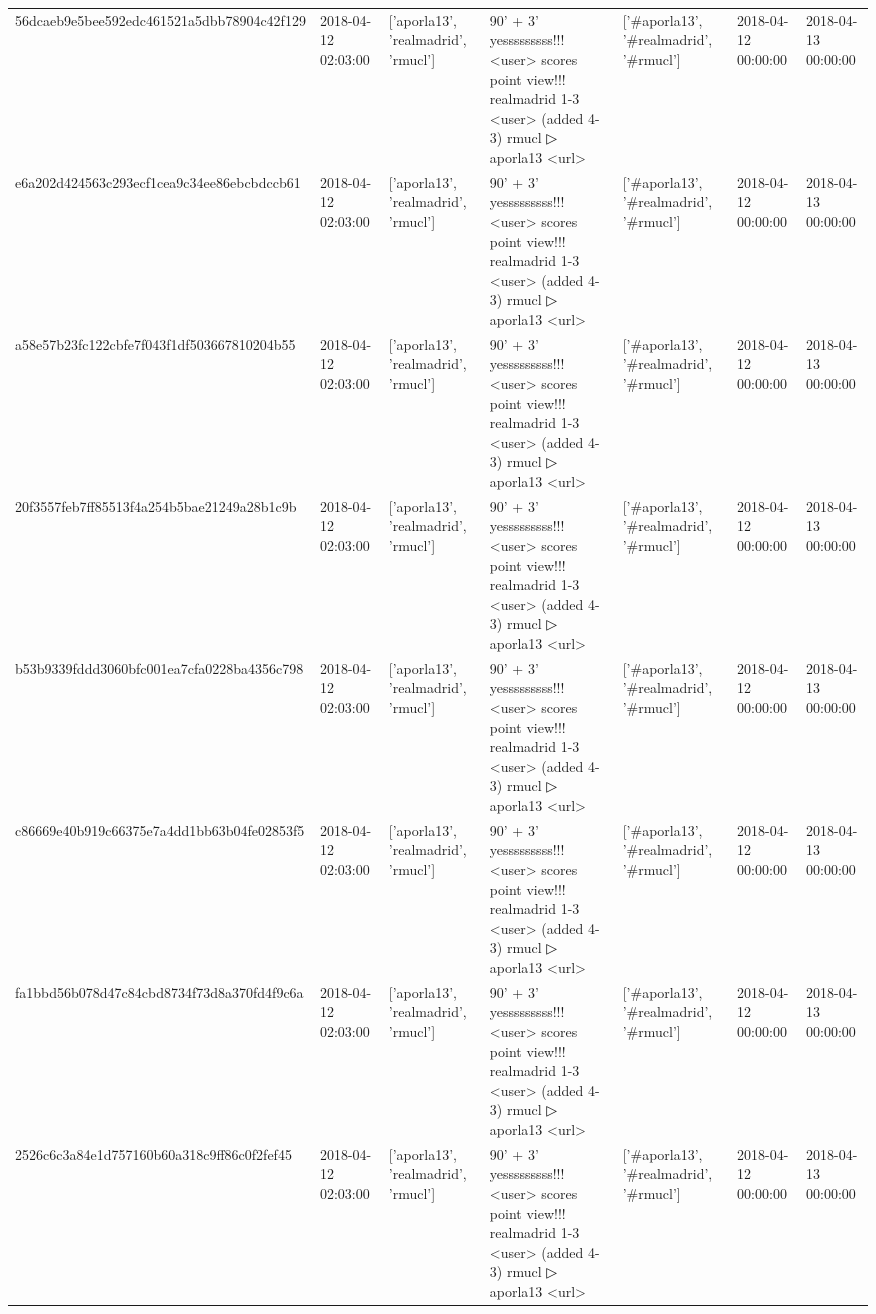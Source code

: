 \begin{tabular}{lllllll}
56dcaeb9e5bee592edc461521a5dbb78904c42f129 & 2018-04-12 02:03:00 & ['aporla13', 'realmadrid', 'rmucl'] & 90' + 3' yesssssssss!!! <user> scores point view!!! realmadrid 1-3 <user> (added 4-3) rmucl ▷ aporla13 <url> & ['#aporla13', '#realmadrid', '#rmucl'] & 2018-04-12 00:00:00 & 2018-04-13 00:00:00 \\
e6a202d424563c293ecf1cea9c34ee86ebcbdccb61 & 2018-04-12 02:03:00 & ['aporla13', 'realmadrid', 'rmucl'] & 90' + 3' yesssssssss!!! <user> scores point view!!! realmadrid 1-3 <user> (added 4-3) rmucl ▷ aporla13 <url> & ['#aporla13', '#realmadrid', '#rmucl'] & 2018-04-12 00:00:00 & 2018-04-13 00:00:00 \\
a58e57b23fc122cbfe7f043f1df503667810204b55 & 2018-04-12 02:03:00 & ['aporla13', 'realmadrid', 'rmucl'] & 90' + 3' yesssssssss!!! <user> scores point view!!! realmadrid 1-3 <user> (added 4-3) rmucl ▷ aporla13 <url> & ['#aporla13', '#realmadrid', '#rmucl'] & 2018-04-12 00:00:00 & 2018-04-13 00:00:00 \\
20f3557feb7ff85513f4a254b5bae21249a28b1c9b & 2018-04-12 02:03:00 & ['aporla13', 'realmadrid', 'rmucl'] & 90' + 3' yesssssssss!!! <user> scores point view!!! realmadrid 1-3 <user> (added 4-3) rmucl ▷ aporla13 <url> & ['#aporla13', '#realmadrid', '#rmucl'] & 2018-04-12 00:00:00 & 2018-04-13 00:00:00 \\
b53b9339fddd3060bfc001ea7cfa0228ba4356c798 & 2018-04-12 02:03:00 & ['aporla13', 'realmadrid', 'rmucl'] & 90' + 3' yesssssssss!!! <user> scores point view!!! realmadrid 1-3 <user> (added 4-3) rmucl ▷ aporla13 <url> & ['#aporla13', '#realmadrid', '#rmucl'] & 2018-04-12 00:00:00 & 2018-04-13 00:00:00 \\
c86669e40b919c66375e7a4dd1bb63b04fe02853f5 & 2018-04-12 02:03:00 & ['aporla13', 'realmadrid', 'rmucl'] & 90' + 3' yesssssssss!!! <user> scores point view!!! realmadrid 1-3 <user> (added 4-3) rmucl ▷ aporla13 <url> & ['#aporla13', '#realmadrid', '#rmucl'] & 2018-04-12 00:00:00 & 2018-04-13 00:00:00 \\
fa1bbd56b078d47c84cbd8734f73d8a370fd4f9c6a & 2018-04-12 02:03:00 & ['aporla13', 'realmadrid', 'rmucl'] & 90' + 3' yesssssssss!!! <user> scores point view!!! realmadrid 1-3 <user> (added 4-3) rmucl ▷ aporla13 <url> & ['#aporla13', '#realmadrid', '#rmucl'] & 2018-04-12 00:00:00 & 2018-04-13 00:00:00 \\
2526c6c3a84e1d757160b60a318c9ff86c0f2fef45 & 2018-04-12 02:03:00 & ['aporla13', 'realmadrid', 'rmucl'] & 90' + 3' yesssssssss!!! <user> scores point view!!! realmadrid 1-3 <user> (added 4-3) rmucl ▷ aporla13 <url> & ['#aporla13', '#realmadrid', '#rmucl'] & 2018-04-12 00:00:00 & 2018-04-13 00:00:00 \\

\end{tabular}
